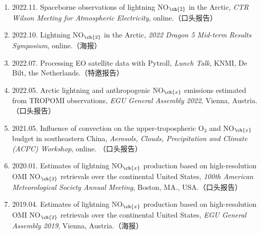 \begin{enumerate}[label={（\arabic*）}, leftmargin=20pt, widest=0, itemindent=*, topsep=0pt, partopsep=0pt, parsep=0pt]

\item 2022.11. Spaceborne observations of lightning NO$_{\ch{2}}$ in the Arctic,
                \emph{CTR Wilson Meeting for Atmospheric Electricity},
                online.（口头报告）

\item 2022.10. Lightning NO$_{\ch{2}}$ in the Arctic,
                \emph{2022 Dragon 5 Mid-term Results Symposium},
                online.（海报）

\item 2022.07. Processing EO satellite data with Pytroll,
                \emph{Lunch Talk},
                KNMI, De Bilt, the Netherlands.（特邀报告）

\item 2022.05. Arctic lightning and anthropogenic NO$_{\ch{x}}$ emissions estimated from TROPOMI observations,
                \emph{EGU General Assembly 2022},
                Vienna, Austria.（口头报告）

\item 2021.05. Influence of convection on the upper-tropospheric O$_3$ and NO$_{\ch{x}}$ budget in southeastern China,
                \emph{Aerosols, Clouds, Precipitation and Climate (ACPC) Workshop},
                online. （口头报告）

\item 2020.01. Estimates of lightning NO$_{\ch{x}}$ production based on high-resolution OMI NO$_{\ch{2}}$ retrievals over the continental United States,
                \emph{100th American Meteorological Society Annual Meeting},
                Boston, MA., USA.（口头报告）

\item 2019.04. Estimates of lightning NO$_{\ch{x}}$ production based on high-resolution OMI NO$_{\ch{2}}$ retrievals over the continental United States,
                \emph{EGU General Assembly 2019},
                Vienna, Austria.（海报）

\end{enumerate}

